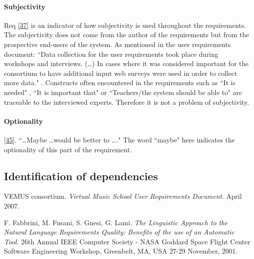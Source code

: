 \documentclass[a4paper,twoside, twocolumn,11pt]{article}
\numberwithin{equation}{section}
\begin{document}
\paragraph{Subjectivity}
Req \ref{37} is an indicator of how subjectivity is used throughout the requirements. The subjectivity does not come from the author of the requirements but from the prospective end-users of the system. As mentioned in the user requirements document: ``Data collection for the user requirements took place during workshops and interviews. (\ldots) In cases where it was considered important for the consortium to have additional input web surveys were used in order to collect more data." \cite{VEMUS}. Constructs often encountered in the requirements such as ``It is needed" , ``It is important that" or ``Teachers/the system should be able to" are traceable to the interviewed experts. Therefore it is not a problem of subjectivity.

\paragraph{Optionality}
\ref{45}. ``\ldots Maybe \ldots would be better to \ldots." The word ``maybe" here indicates the optionality of this part of the requirement.

\subsection{Identification of dependencies}

\begin{thebibliography}{9}
VEMUS consortium. \emph{Virtual Music School User Requirements Document}.
April 2007.

F. Fabbrini, M. Fusani, S. Gnesi, G. Lami. \emph{The Linguistic Approach to the Natural Language Requirements Quality: Benefits of the use of an Automatic Tool.} 26th Annual IEEE Computer Society - NASA Goddard Space Flight Center Software Engineering Workshop, Greenbelt, MA, USA 27-29 November, 2001.
\end{thebibliography}
\end{document}

